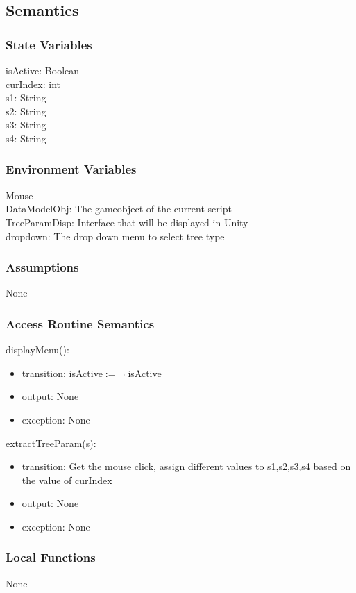 \documentclass[12pt, titlepage]{article}
\begin{document}
\subsection{Semantics}

\subsubsection{State Variables}
isActive: Boolean\\
curIndex: int\\
s1: String\\
s2: String\\
s3: String\\
s4: String\\


\subsubsection{Environment Variables}
Mouse\\
DataModelObj: The gameobject of the current script\\
TreeParamDisp: Interface that will be displayed in Unity\\
dropdown: The drop down menu to select tree type
\subsubsection{Assumptions}
None
\subsubsection{Access Routine Semantics}

\noindent displayMenu():
\begin{itemize}
\item transition: isActive$\mathit{:= \neg }$ isActive
\item output: None
\item exception: None

\end{itemize}


\noindent extractTreeParam(s):
\begin{itemize}
\item transition: Get the mouse click, assign different values to s1,s2,s3,s4 based on the value of curIndex
\item output: None
\item exception: None
\end{itemize}

\subsubsection{Local Functions}
None
\end{document}
